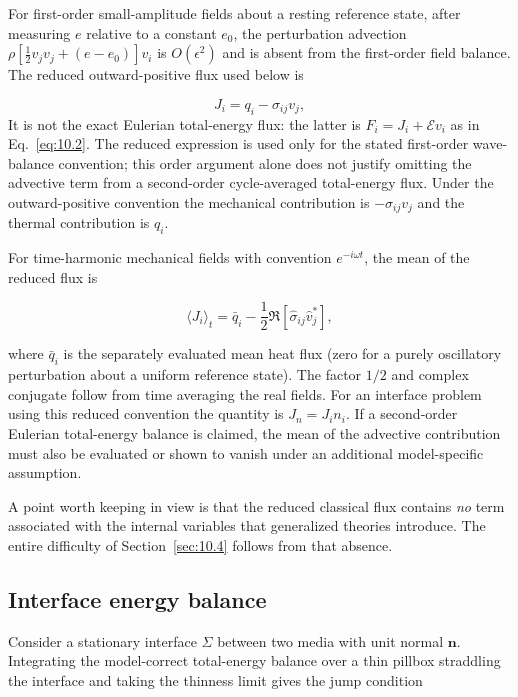 For first-order small-amplitude fields about a resting reference state, after measuring $e$ relative to a constant $e_0$, the perturbation advection $\rho[\tfrac12 v_jv_j+(e-e_0)]v_i$ is $O(\epsilon^2)$ and is absent from the first-order field balance. The reduced outward-positive flux used below is

\begin{equation}
J_i = q_i - \sigma_{ij}v_j,
\label{eq:10.3}
\end{equation}
It is not the exact Eulerian total-energy flux: the latter is $F_i=J_i+\mathcal{E}v_i$ as in Eq.~\eqref{eq:10.2}. The reduced expression is used only for the stated first-order wave-balance convention; this order argument alone does not justify omitting the advective term from a second-order cycle-averaged total-energy flux. Under the outward-positive convention the mechanical contribution is $-\sigma_{ij}v_j$ and the thermal contribution is $q_i$.

For time-harmonic mechanical fields with convention $e^{-i\omega t}$, the mean of the reduced flux is

\begin{equation}
\langle J_i\rangle_t=\bar q_i-\frac12\Re[\hat{\sigma}_{ij}\hat{v}_j^*],
\label{eq:10.4}
\end{equation}

where $\bar q_i$ is the separately evaluated mean heat flux (zero for a purely oscillatory perturbation about a uniform reference state). The factor $1/2$ and complex conjugate follow from time averaging the real fields. For an interface problem using this reduced convention the quantity is $J_n=J_i n_i$. If a second-order Eulerian total-energy balance is claimed, the mean of the advective contribution must also be evaluated or shown to vanish under an additional model-specific assumption.

A point worth keeping in view is that the reduced classical flux contains \emph{no} term associated with the internal variables that generalized theories introduce. The entire difficulty of Section~\ref{sec:10.4} follows from that absence.





\subsection{Interface energy balance}
\label{sec:10.3}

Consider a stationary interface $\Sigma$ between two media with unit normal $\bm{n}$. Integrating the model-correct total-energy balance over a thin pillbox straddling the interface and taking the thinness limit gives the jump condition

